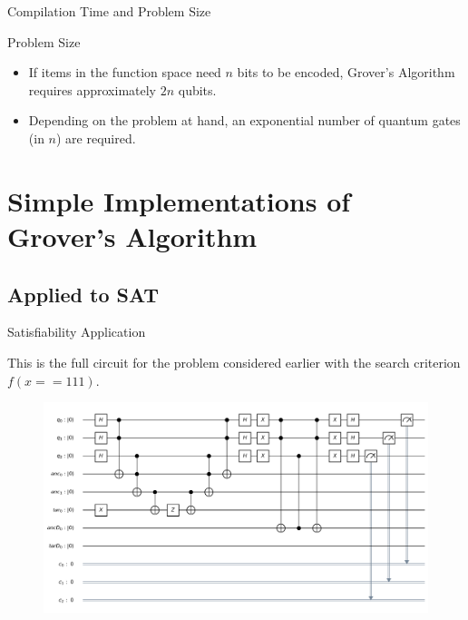 \documentclass{beamer}
\begin{document}
\begin{frame}{Compilation Time and Problem Size}
	\begin{block}{Problem Size}
		\begin{itemize}
			\item If items in the function space need $n$ bits to be encoded, Grover's Algorithm requires approximately $2n$ qubits.
			\item Depending on the problem at hand, an exponential number of quantum gates (in $n$) are required.

		\end{itemize}
	\end{block}
\end{frame}

\section{Simple Implementations of Grover's Algorithm}

\subsection{Applied to SAT}
\begin{frame}{Satisfiability Application}
	\begin{center}
		This is the full circuit for the problem considered earlier with the search criterion $f(x==111)$.
	\end{center}
	\begin{figure}[Satisfiability 111]
		\centering
		\includegraphics[scale=.3]{./gidney3_class.png}
	\end{figure}
\end{frame}
\end{document}
